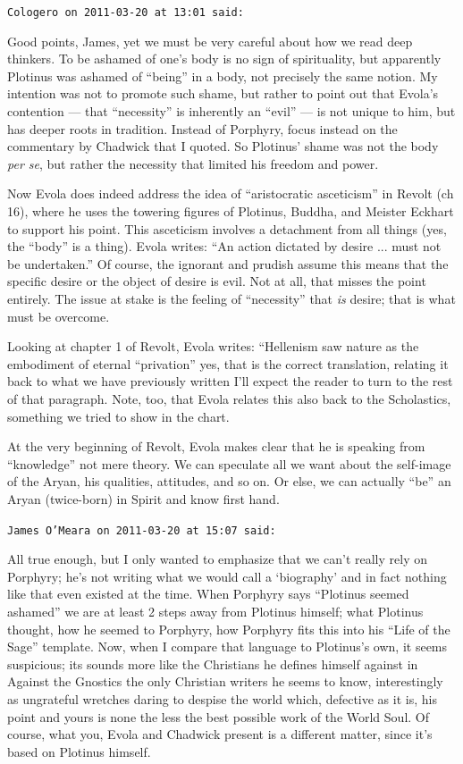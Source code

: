 \begin{footnotesize}
\begin{sffamily}
\hfill

\texttt{Cologero on 2011-03-20 at 13:01 said:}

Good points, James, yet we must be very careful about how we read deep thinkers. To be ashamed of one's body is no sign of spirituality, but apparently Plotinus was ashamed of ``being'' in a body, not precisely the same notion. My intention was not to promote such shame, but rather to point out that Evola's contention --- that ``necessity'' is inherently an ``evil'' --- is not unique to him, but has deeper roots in tradition. Instead of Porphyry, focus instead on the commentary by Chadwick that I quoted. So Plotinus' shame was not the body \emph{per se}, but rather the necessity that limited his freedom and power.

Now Evola does indeed address the idea of ``aristocratic asceticism'' in Revolt (ch 16), where he uses the towering figures of Plotinus, Buddha, and Meister Eckhart to support his point. This asceticism involves a detachment from all things (yes, the ``body'' is a thing). Evola writes: ``An action dictated by desire ... must not be undertaken.'' Of course, the ignorant and prudish assume this means that the specific desire or the object of desire is evil. Not at all, that misses the point entirely. The issue at stake is the feeling of ``necessity'' that \emph{is} desire; that is what must be overcome.

Looking at chapter 1 of Revolt, Evola writes: ``Hellenism saw nature as the embodiment of eternal ``privation'' yes, that is the correct translation, relating it back to what we have previously written I'll expect the reader to turn to the rest of that paragraph. Note, too, that Evola relates this also back to the Scholastics, something we tried to show in the chart.

At the very beginning of Revolt, Evola makes clear that he is speaking from ``knowledge'' not mere theory. We can speculate all we want about the self-image of the Aryan, his qualities, attitudes, and so on. Or else, we can actually ``be'' an Aryan (twice-born) in Spirit and know first hand.

\hfill

\texttt{James O'Meara on 2011-03-20 at 15:07 said:}

All true enough, but I only wanted to emphasize that we can't really rely on Porphyry; he's not writing what we would call a `biography' and in fact nothing like that even existed at the time. When Porphyry says ``Plotinus seemed ashamed'' we are at least 2 steps away from Plotinus himself; what Plotinus thought, how he seemed to Porphyry, how Porphyry fits this into his ``Life of the Sage'' template. Now, when I compare that language to Plotinus's own, it seems suspicious; its sounds more like the Christians he defines himself against in Against the Gnostics the only Christian writers he seems to know, interestingly as ungrateful wretches daring to despise the world which, defective as it is, his point and yours is none the less the best possible work of the World Soul. Of course, what you, Evola and Chadwick present is a different matter, since it's based on Plotinus himself.


\end{sffamily}
\end{footnotesize}

